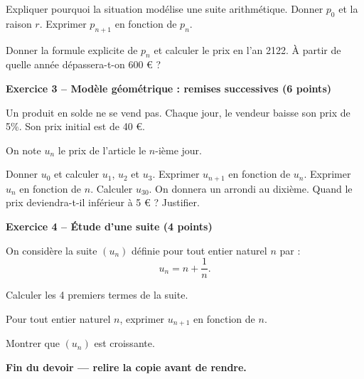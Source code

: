 \documentclass[12pt,a4paper]{exam}
\begin{document}
\begin{questions}
    \question[1] Expliquer pourquoi la situation modélise une suite arithmétique.
    \question[1] Donner \(p_0\) et la raison \(r\).
    \question[2] Exprimer $p_{n+1}$ en fonction de $p_n$.
    \question[1] Donner la formule explicite de \(p_n\) et calculer le prix en l'an 2122.
    \question[1] À partir de quelle année dépassera-t-on 600 € ?
\end{questions}

\noindent\hrulefill
\vspace{0.5cm}

\textbf{Exercice 3 – Modèle géométrique : remises successives (6 points)}
\vspace{5pt}

Un produit en solde ne se vend pas. Chaque jour, le vendeur baisse son prix de 5\%.
Son prix initial est de 40 €.

On note \(u_n\) le prix de l'article le \(n\)-ième jour.

\begin{questions}
    \question[1] Donner $u_0$ et calculer $u_1$, $u_2$ et $u_3$.
    \question[1,5] Exprimer $u_{n+1}$ en fonction de $u_n$.
    \question[1] Exprimer \(u_n\) en fonction de $n$.
    \question[1] Calculer $u_{30}$. On donnera un arrondi au dixième.
    \question[1,5] Quand le prix deviendra-t-il inférieur à 5 € ? Justifier.
\end{questions}

\noindent\hrulefill
\vspace{0.5cm}

\textbf{Exercice 4 – Étude d'une suite (4 points)}
\vspace{5pt}

On considère la suite $(u_n)$ définie pour tout entier naturel $n$ par :
\[
u_n = n + \dfrac{1}{n}.
\]

\begin{questions}
    \question[1] Calculer les 4 premiers termes de la suite.

    \question[1] Pour tout entier naturel $n$, exprimer $u_{n+1}$ en fonction de $n$.

    \question[1] Montrer que $(u_n)$ est croissante.
\end{questions}

\noindent\hrulefill


\vspace{0.5cm}
\begin{center}
\textbf{Fin du devoir — relire la copie avant de rendre.}
\end{center}
\end{document}
